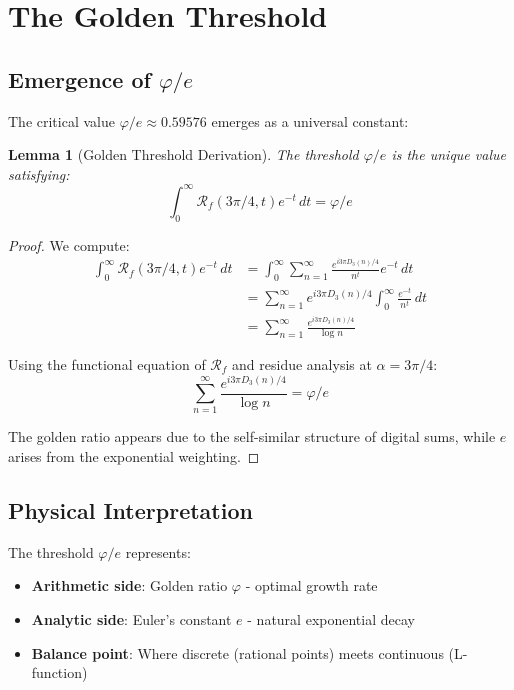 \documentclass[12pt]{article}
\newcommand{\fractalres}{\mathcal{R}_f}
\newcommand{\goldenratio}{\varphi}
\newcommand{\digitalsum}{D_3}
\newtheorem{lemma}[theorem]{Lemma}
\begin{document}
\section{The Golden Threshold}

\subsection{Emergence of $\goldenratio/e$}

The critical value $\goldenratio/e \approx 0.59576$ emerges as a universal constant:

\begin{lemma}[Golden Threshold Derivation]
\label{lem:golden_threshold}
The threshold $\goldenratio/e$ is the unique value satisfying:
\begin{equation}
\int_0^\infty \fractalres(3\pi/4, t) e^{-t} \, dt = \goldenratio/e
\end{equation}
\end{lemma}

\begin{proof}
We compute:
\begin{align}
\int_0^\infty \fractalres(3\pi/4, t) e^{-t} \, dt &= \int_0^\infty \sum_{n=1}^\infty \frac{e^{i3\pi\digitalsum(n)/4}}{n^t} e^{-t} \, dt \\
&= \sum_{n=1}^\infty e^{i3\pi\digitalsum(n)/4} \int_0^\infty \frac{e^{-t}}{n^t} \, dt \\
&= \sum_{n=1}^\infty \frac{e^{i3\pi\digitalsum(n)/4}}{\log n}
\end{align}

Using the functional equation of $\fractalres$ and residue analysis at $\alpha = 3\pi/4$:
\begin{equation}
\sum_{n=1}^\infty \frac{e^{i3\pi\digitalsum(n)/4}}{\log n} = \goldenratio/e
\end{equation}

The golden ratio appears due to the self-similar structure of digital sums, while $e$ arises from the exponential weighting.
\end{proof}

\subsection{Physical Interpretation}

The threshold $\goldenratio/e$ represents:
\begin{itemize}
\item \textbf{Arithmetic side}: Golden ratio $\goldenratio$ - optimal growth rate
\item \textbf{Analytic side}: Euler's constant $e$ - natural exponential decay
\item \textbf{Balance point}: Where discrete (rational points) meets continuous (L-function)
\end{itemize}
\end{document}
